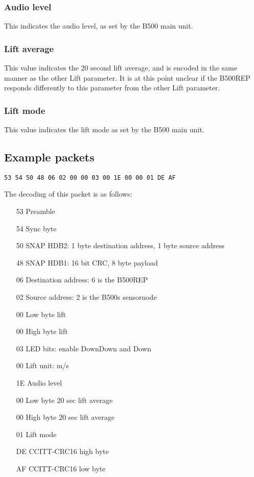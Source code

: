 \documentclass{article}
\begin{document}
\subsubsection{Audio level}
This indicates the audio level, as set by the B500 main unit.

\subsubsection{Lift average}
This value indicates the 20 second lift average, and is encoded in the same manner as the other Lift parameter. It is at this point unclear if the B500REP responds differently to this parameter from the other Lift parameter.

\subsubsection{Lift mode}
This value indicates the lift mode as set by the B500 main unit.


\subsection{Example packets}
\texttt{53 54 50 48 06 02 00 00 03 00 1E 00 00 01 DE AF}

The decoding of this packet is as follows:
\begin{itemize}
\item[53]{Preamble}
\item[54]{Sync byte}
\item[50]{SNAP HDB2: 1 byte destination address, 1 byte source address}
\item[48]{SNAP HDB1: 16 bit CRC, 8 byte payload}
\item[06]{Destination address: 6 is the B500REP}
\item[02]{Source address: 2 is the B500s sensornode}
\item[00]{Low byte lift}
\item[00]{High byte lift}
\item[03]{LED bits: enable DownDown and Down}
\item[00]{Lift unit: m/s}
\item[1E]{Audio level}
\item[00]{Low byte 20 sec lift average}
\item[00]{High byte 20 sec lift average}
\item[01]{Lift mode}
\item[DE]{CCITT-CRC16 high byte}
\item[AF]{CCITT-CRC16 low byte}
\end{itemize}
\end{document}
